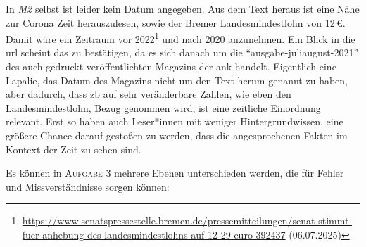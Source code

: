 In \emph{M2} selbst ist leider kein Datum angegeben. Aus dem Text heraus ist eine Nähe zur Corona Zeit herauszulesen, sowie der Bremer Landesmindestlohn von 12\,€. Damit wäre ein Zeitraum vor 2022\footnote{
    \url{https://www.senatspressestelle.bremen.de/pressemitteilungen/senat-stimmt-fuer-anhebung-des-landesmindestlohns-auf-12-29-euro-392437} (06.07.2025)
} und nach 2020 anzunehmen. Ein Blick in die \gls{url} scheint das zu bestätigen, da es sich danach um die \enquote{ausgabe-juliaugust-2021} des auch gedruckt veröffentlichten Magazins der \gls{ank} handelt. Eigentlich eine Lapalie, das Datum des Magazins nicht um den Text herum genannt zu haben, aber dadurch, dass \gls{zb} auf sehr veränderbare Zahlen, wie eben den Landesmindestlohn, Bezug genommen wird, ist eine zeitliche Einordnung relevant. Erst so haben auch Leser*innen mit weniger Hintergrundwissen, eine größere Chance darauf gestoßen zu werden, dass die angesprochenen Fakten im Kontext der Zeit zu sehen sind. 



Es können in \textsc{Aufgabe 3} mehrere Ebenen unterschieden werden, die für Fehler und Missverständnisse sorgen können:

